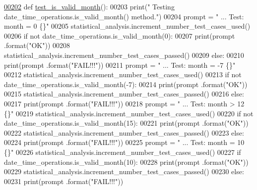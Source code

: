 \begin{DoxyCode}
\hypertarget{classutilities_1_1date__time__processing__tester_1_1date__time__operations__tester_l00202}{}\hyperlink{classutilities_1_1date__time__processing__tester_1_1date__time__operations__tester_ae3d0fc5e01b44ebe36ef28464f1f755a}{00202}     \textcolor{keyword}{def }\hyperlink{classutilities_1_1date__time__processing__tester_1_1date__time__operations__tester_ae3d0fc5e01b44ebe36ef28464f1f755a}{test\_is\_valid\_month}():
00203         print(\textcolor{stringliteral}{" Testing date\_time\_operations.is\_valid\_month() method."})
00204         prompt = \textcolor{stringliteral}{"  ... Test: month = 0                 \{\}"}
00205         statistical\_analysis.increment\_number\_test\_cases\_used()
00206         \textcolor{keywordflow}{if} \textcolor{keywordflow}{not} date\_time\_operations.is\_valid\_month(0):
00207             print(prompt .format(\textcolor{stringliteral}{"OK"}))
00208             statistical\_analysis.increment\_number\_test\_cases\_passed()
00209         \textcolor{keywordflow}{else}:
00210             print(prompt .format(\textcolor{stringliteral}{"FAIL!!!"}))
00211         prompt = \textcolor{stringliteral}{"  ... Test: month = -7                    \{\}"}
00212         statistical\_analysis.increment\_number\_test\_cases\_used()
00213         \textcolor{keywordflow}{if} \textcolor{keywordflow}{not} date\_time\_operations.is\_valid\_month(-7):
00214             print(prompt .format(\textcolor{stringliteral}{"OK"}))
00215             statistical\_analysis.increment\_number\_test\_cases\_passed()
00216         \textcolor{keywordflow}{else}:
00217             print(prompt .format(\textcolor{stringliteral}{"FAIL!!!"}))
00218         prompt = \textcolor{stringliteral}{"  ... Test: month > 12                    \{\}"}
00219         statistical\_analysis.increment\_number\_test\_cases\_used()
00220         \textcolor{keywordflow}{if} \textcolor{keywordflow}{not} date\_time\_operations.is\_valid\_month(15):
00221             print(prompt .format(\textcolor{stringliteral}{"OK"}))
00222             statistical\_analysis.increment\_number\_test\_cases\_passed()
00223         \textcolor{keywordflow}{else}:
00224             print(prompt .format(\textcolor{stringliteral}{"FAIL!!!"}))
00225         prompt = \textcolor{stringliteral}{"  ... Test: month = 10                    \{\}"}
00226         statistical\_analysis.increment\_number\_test\_cases\_used()
00227         \textcolor{keywordflow}{if} date\_time\_operations.is\_valid\_month(10):
00228             print(prompt .format(\textcolor{stringliteral}{"OK"}))
00229             statistical\_analysis.increment\_number\_test\_cases\_passed()
00230         \textcolor{keywordflow}{else}:
00231             print(prompt .format(\textcolor{stringliteral}{"FAIL!!!"}))
\end{DoxyCode}
